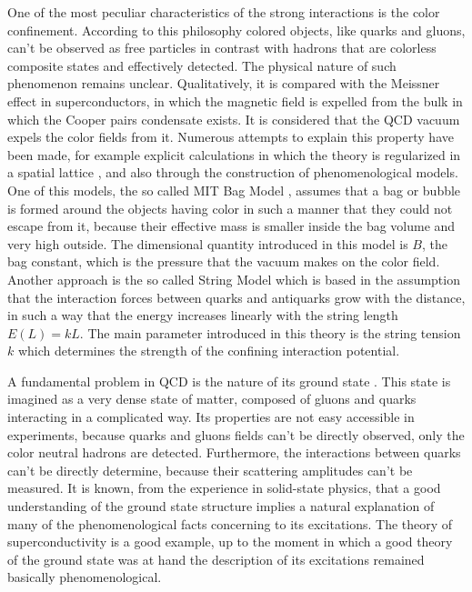 \documentclass[12pt,letterpaper]{report}
\begin{document}
One of the most peculiar characteristics of the strong
interactions is the color confinement. According to this
philosophy colored objects, like quarks and gluons, can't be
observed as free particles in contrast with hadrons that are
colorless composite states and effectively detected. The physical
nature of such phenomenon remains unclear. Qualitatively, it is
compared with the Meissner effect in superconductors, in which the
magnetic field is expelled from the bulk in which the Cooper pairs
condensate exists. It is considered that the QCD vacuum expels the
color fields from it. Numerous attempts to explain this property
have been made, for example explicit calculations in which the
theory is regularized in a spatial lattice \cite{Creutz}, and also
through the construction of phenomenological models. One of this
models, the so called MIT Bag Model \cite{Chodos}, assumes that a
bag or bubble is formed around the objects having color in such a
manner that they could not escape from it, because their effective
mass is smaller inside the bag volume and very high outside. The
dimensional quantity introduced in this model is $B$, the bag
constant, which is the pressure that the vacuum makes on the color
field. Another approach is the so called String Model
\cite{Gervais} which is based in the assumption that the
interaction forces between quarks and antiquarks grow with the
distance, in such a way that the energy increases linearly with
the string length $E(L)=kL$. The main parameter introduced in this
theory is the string tension $k$ which determines the strength of
the confining interaction potential.

A fundamental problem in QCD is the nature of its ground state
\cite{Shuryak}. This state is imagined as a very dense state of
matter, composed of gluons and quarks interacting in a complicated
way. Its properties are not easy accessible in experiments,
because quarks and gluons fields can't be directly observed, only
the color neutral hadrons are detected. Furthermore, the
interactions between quarks can't be directly determine, because
their scattering amplitudes can't be measured. It is known, from
the experience in solid-state physics, that a good understanding
of the ground state structure implies a natural explanation of
many of the phenomenological facts concerning to its excitations.
The theory of superconductivity is a good example, up to the
moment in which a good theory of the ground state was at hand the
description of its excitations remained basically
phenomenological.
\end{document}

